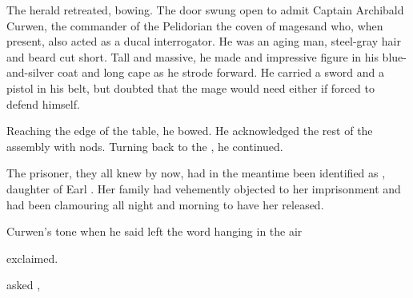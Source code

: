 \begin{garbage}


The herald retreated, bowing. The door swung open to admit Captain Archibald Curwen, the commander of the Pelidorian \dash the coven of mages\dash and who, when present, also acted as a ducal interrogator. 
He was an aging man, steel-gray hair and beard cut short. Tall and massive, he made and impressive figure in his blue-and-silver coat and long cape as he strode forward. 
He carried a sword and a pistol in his belt, but \Tiroco{} doubted that the mage would need either if forced to defend himself. 

Reaching the edge of the table, he bowed. 
He acknowledged the rest of the assembly with nods. 
Turning back to the \rinyuth, he continued. 



The prisoner, they all knew by now, had in the meantime been identified as \Constance{} \Kintaer{}, daughter of Earl \Theal{} \Kintaer{}. Her family had vehemently objected to her imprisonment and had been clamouring all night and morning to have her released. 

\dash Curwen's tone when he said  left the word  hanging in the air\dash{} 

 \Dornaer{} exclaimed. 

 asked \Vincerre, 


\end{garbage}
